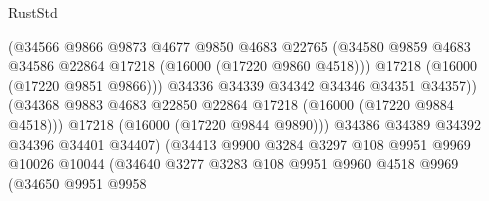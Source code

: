 \begin{lexlean}{RustStd}
\begin{coremodule}
                                        (@34566
                                          @9866
                                          @9873
                                          @4677
                                          @9850
                                          @4683
                                          @22765
                                          (@34580
                                            @9859
                                            @4683
                                            @34586
                                            @22864
                                            @17218
                                            (@16000 (@17220 @9860 @4518)))
                                          @17218
                                          (@16000 (@17220 @9851 @9866)))
                                        @34336
                                        @34339
                                        @34342
                                        @34346
                                        @34351
                                        @34357))
                                    (@34368
                                      @9883
                                      @4683
                                      @22850
                                      @22864
                                      @17218
                                      (@16000 (@17220 @9884 @4518)))
                                    @17218
                                    (@16000 (@17220 @9844 @9890)))
                                  @34386
                                  @34389
                                  @34392
                                  @34396
                                  @34401
                                  @34407)
                                (@34413
                                  @9900
                                  @3284
                                  @3297
                                  @108
                                  @9951
                                  @9969
                                  @10026
                                  @10044
                                  (@34640
                                    @3277
                                    @3283
                                    @108
                                    @9951
                                    @9960
                                    @4518
                                    @9969
                                    (@34650
                                      @9951
                                      @9958

\end{coremodule}
\end{lexlean}
